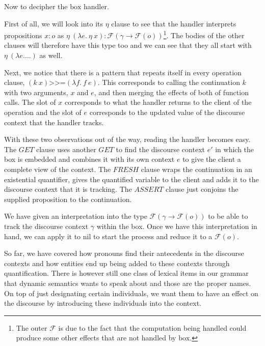 \documentclass{article}
\newcommand{\hsbind}{\mathbin{\texttt{>>=}}}
\begin{document}
Now to decipher the $\mathrm{box}$ handler.

First of all, we will look into its $\eta$ clause to see that the handler
interprets propositions $x : o$ as $\eta\ (\lambda e.\ \eta\ x) :
\mathcal{F}(\gamma \to \mathcal{F}(o))$\footnote{The outer $\mathcal{F}$ is
  due to the fact that the computation being handled could produce some
  other effects that are not handled by $\mathrm{box}$.}. The bodies of the
other clauses will therefore have this type too and we can see that they
all start with $\eta\ (\lambda e. \ldots)$ as well.

Next, we notice that there is a pattern that repeats itself in every
operation clause, $(k\ x) \hsbind (\lambda f.\ f\ e)$. This corresponds to
calling the continuation $k$ with two arguments, $x$ and $e$, and then
merging the effects of both of function calls. The slot of $x$ corresponds
to what the handler returns to the client of the operation and the slot of
$e$ corresponds to the updated value of the discourse context that the
handler tracks.

With these two observations out of the way, reading the handler becomes
easy. The $GET$ clause uses another $GET$ to find the discourse context
$e'$ in which the box is embedded and combines it with its own context $e$
to give the client a complete view of the context. The $FRESH$ clause wraps
the continuation in an existential quantifier, gives the quantified
variable to the client and adds it to the discourse context that it is
tracking. The $ASSERT$ clause just conjoins the supplied proposition to the
continuation.

We have given an interpretation into the type $\mathcal{F}(\gamma \to
\mathcal{F}(o))$ to be able to track the discourse context $\gamma$ within
the box. Once we have this interpretation in hand, we can apply it to
$\mathrm{nil}$ to start the process and reduce it to a $\mathcal{F}(o)$.

So far, we have covered how pronouns find their antecedents in the
discourse contexts and how entities end up being added to these contexts
through quantification. There is however still one class of lexical items
in our grammar that dynamic semantics wants to speak about and those are
the proper names. On top of just designating certain individuals, we want
them to have an effect on the discourse by introducing these individuals
into the context.
\end{document}
